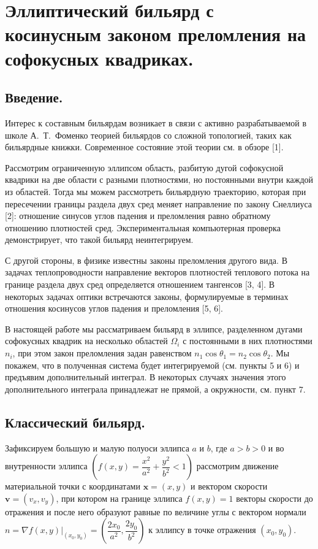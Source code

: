 \chapter{Эллиптический бильярд с косинусным законом преломления на софокусных квадриках.}\label{ch:ch3}

\section{Введение.}\label{sec:ch3/sect1}
Интерес к составным бильярдам возникает в связи с активно разрабатываемой  в школе А.~Т.~Фоменко теорией бильярдов со сложной топологией, таких как бильярдные книжки. Современное состояние этой теории см. в обзоре [1].  

Рассмотрим ограниченную эллипсом область, разбитую дугой софокусной квадрики на две области с разными плотностями, но постоянными внутри каждой из областей. Тогда мы можем рассмотреть бильярдную траекторию, которая при пересечении границы раздела двух сред меняет направление по закону Снеллиуса [2]: отношение синусов углов падения и преломления равно обратному отношению плотностей сред. 
Экспериментальная компьютерная проверка демонстрирует, что такой бильярд неинтегрируем. 

С другой стороны, в физике известны законы преломления другого вида. 
В задачах теплопроводности направление векторов плотностей теплового потока на границе раздела двух сред определяется отношением тангенсов [3, 4].
В некоторых задачах оптики встречаются законы, формулируемые в терминах отношения косинусов углов падения и преломления [5, 6].

В настоящей работе мы рассматриваем бильярд в эллипсе, разделенном дугами софокусных квадрик на несколько областей $\Omega_i$ с постоянными в них плотностями $n_i$, при этом закон преломления задан равенством $n_1 \cos{\theta_1} = n_2 \cos{\theta_2}$. Мы покажем, что в полученная система будет интегрируемой (см. пункты 5 и 6) и предъявим дополнительный интеграл. В некоторых случаях значения этого дополнительного интеграла принадлежат не прямой, а окружности, см. пункт 7.


\section{Классический бильярд.}

Зафиксируем большую и малую полуоси эллипса $a$ и $b$, где $a > b > 0$ и во внутренности эллипса $\left(f(x, y) = \dfrac{x^2}{a^2}+\dfrac{y^2}{b^2} < 1 \right)$ рассмотрим движение материальной точки с координатами $\mathbf{x} = (x, y)$ и вектором скорости $\mathbf{v} = (v_x, v_y)$, при котором на границе эллипса $f(x, y) = 1$ векторы скорости до отражения и после него образуют равные по величине углы с вектором нормали $n=\left.\nabla f(x,y)\right|_{(x_0,y_0)} = \left( \dfrac{2x_0}{a^2},\dfrac{2y_0}{b^2}\right)$ к эллипсу в точке отражения $(x_0, y_0)$.

